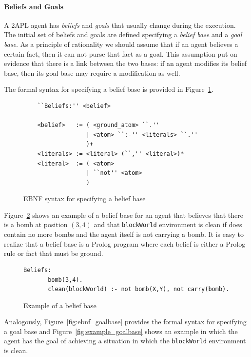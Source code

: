 \documentclass[a4paper]{article}
\begin{document}
\paragraph{Beliefs and Goals}

A 2APL agent has \emph{beliefs} and \emph{goals} that usually change during the execution. The initial set of beliefs and goals are defined specifying a \emph{belief base} and a \emph{goal base}. As a principle of rationality we should assume that if an agent believes a certain fact, then it can not purse that fact as a goal. This assumption put on evidence that there is a link between the two bases: if an agent modifies its belief base, then its goal base may require a modification as well. 

The formal syntax for specifying a belief base is provided in Figure~\ref{fig:ebnf_beliefbase}. 

\begin{figure}[htp]
\begin{verbatim}
	``Beliefs:'' <belief>
	
	<belief>   := ( <ground_atom> ``.''
	              | <atom> ``:-'' <literals> ``.'' 
	              )+
	<literals> := <literal> (``,'' <literal>)*
	<literal>  := ( <atom> 
	              | ``not'' <atom>
	              )
	\end{verbatim}
\caption{EBNF syntax for specifying a belief base}
\label{fig:ebnf_beliefbase}
\end{figure}

Figure~\ref{fig:example_beliefbase} shows an example of a belief base for an agent that believes that there is a bomb at position $(3,4)$ and that \texttt{blockWorld} environment is clean if does contain no more bombs and the agent itself is not carrying a bomb. It is easy to realize that a belief base is a Prolog program where each belief is either a Prolog rule or fact that must be ground.

\begin{figure}[htp]
\begin{verbatim}
Beliefs:
       bomb(3,4).
       clean(blockWorld) :- not bomb(X,Y), not carry(bomb).
\end{verbatim}
\caption{Example of a belief base}
\label{fig:example_beliefbase}
\end{figure}

Analogously, Figure~\ref{fig:ebnf_goalbase} provides the formal syntax for specifying a goal base and Figure~\ref{fig:example_goalbase} shows an example in which the agent has the goal of achieving a situation in which the \texttt{blockWorld} environment is clean. %
\end{document}
